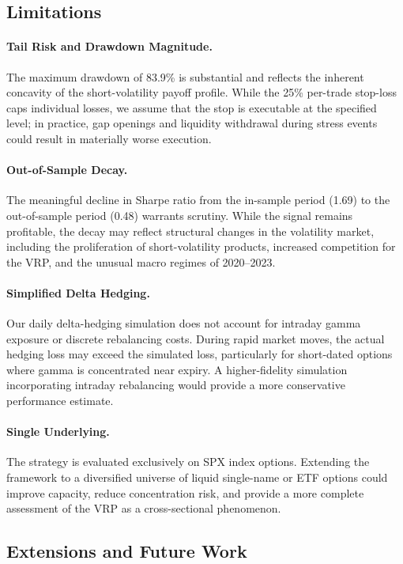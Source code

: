 \documentclass[11pt,a4paper]{article}
\begin{document}
\subsection{Limitations}

\paragraph{Tail Risk and Drawdown Magnitude.}
The maximum drawdown of 83.9\% is substantial and reflects the inherent concavity of the short-volatility payoff profile.
While the 25\% per-trade stop-loss caps individual losses, we assume that the stop is executable at the specified level; in practice, gap openings and liquidity withdrawal during stress events could result in materially worse execution.

\paragraph{Out-of-Sample Decay.}
The meaningful decline in Sharpe ratio from the in-sample period (1.69) to the out-of-sample period (0.48) warrants scrutiny.
While the signal remains profitable, the decay may reflect structural changes in the volatility market, including the proliferation of short-volatility products, increased competition for the VRP, and the unusual macro regimes of 2020--2023.

\paragraph{Simplified Delta Hedging.}
Our daily delta-hedging simulation does not account for intraday gamma exposure or discrete rebalancing costs.
During rapid market moves, the actual hedging loss may exceed the simulated loss, particularly for short-dated options where gamma is concentrated near expiry.
A higher-fidelity simulation incorporating intraday rebalancing would provide a more conservative performance estimate.

\paragraph{Single Underlying.}
The strategy is evaluated exclusively on SPX index options.
Extending the framework to a diversified universe of liquid single-name or ETF options could improve capacity, reduce concentration risk, and provide a more complete assessment of the VRP as a cross-sectional phenomenon.

\subsection{Extensions and Future Work}
\end{document}
